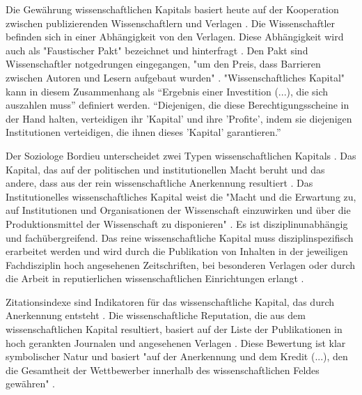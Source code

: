 Die Gewährung wissenschaftlichen Kapitals basiert heute auf der Kooperation zwischen publizierenden Wissenschaftlern und Verlagen \cite{herb_2006}. Die Wissenschaftler befinden sich in einer Abhängigkeit von den Verlagen. Diese Abhängigkeit wird auch als "Faustischer Pakt" bezeichnet und hinterfragt \cite{hagner_2015_sache_buches} \cite{Parks_2002_acadamic_faust}. Den Pakt sind Wissenschaftler notgedrungen eingegangen, "um den Preis, dass Barrieren zwischen Autoren und Lesern aufgebaut wurden" \cite{hagner_2015_sache_buches}. "Wissenschaftliches Kapital" kann in diesem Zusammenhang als “Ergebnis einer Investition (...), die sich auszahlen muss” \cite{herb_2006} definiert werden. “Diejenigen, die diese Berechtigungsscheine in der Hand halten, verteidigen ihr 'Kapital' und ihre 'Profite', indem sie diejenigen Institutionen verteidigen, die ihnen dieses 'Kapital' garantieren.” \cite{Bourdieu_1992}

Der Soziologe Bordieu unterscheidet zwei Typen wissenschaftlichen Kapitals \cite{Bourdieu_1998}. Das Kapital, das auf der politischen und institutionellen Macht beruht und das andere, dass aus der rein wissenschaftliche Anerkennung resultiert \cite{mikl_2010_soziologie}. Das Institutionelles wissenschaftliches Kapital weist die "Macht und die Erwartung zu, auf Institutionen und Organisationen der Wissenschaft einzuwirken und über die Produktionsmittel der Wissenschaft zu disponieren" \cite[:257]{Barl_sius_2008}. Es ist disziplinunabhängig und fachübergreifend. Das reine wissenschaftliche Kapital muss disziplinspezifisch erarbeitet werden und wird durch die Publikation von Inhalten in der jeweiligen Fachdisziplin hoch angesehenen Zeitschriften, bei besonderen Verlagen oder durch die Arbeit in reputierlichen wissenschaftlichen Einrichtungen erlangt \cite[:257]{Barl_sius_2008}.

Zitationsindexe sind Indikatoren für das wissenschaftliche Kapital, das durch Anerkennung entsteht \cite{Bourdieu_1998}. Die wissenschaftliche Reputation, die aus dem wissenschaftlichen Kapital resultiert, basiert auf der Liste der Publikationen in hoch gerankten Journalen und angesehenen Verlagen \cite{herb_2010}. Diese Bewertung ist klar symbolischer Natur und basiert "auf der Anerkennung und dem Kredit (...), den die Gesamtheit der Wettbewerber innerhalb des wissenschaftlichen Feldes gewähren" \cite{Bourdieu_1998} \cite{Barl_sius_2008} \cite{herb_2010}.


